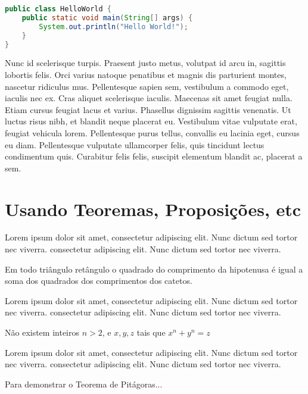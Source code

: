 \begin{lstlisting}[language=Java,caption={Hello World em Java}]
public class HelloWorld {
	public static void main(String[] args) {
		System.out.println("Hello World!");
	}
}
\end{lstlisting}

Nunc id scelerisque turpis. Praesent justo metus, volutpat id arcu in, sagittis lobortis felis. Orci varius natoque penatibus et magnis dis parturient montes, nascetur ridiculus mus. Pellentesque sapien sem, vestibulum a commodo eget, iaculis nec ex. Cras aliquet scelerisque iaculis. Maecenas sit amet feugiat nulla. Etiam cursus feugiat lacus et varius. Phasellus dignissim sagittis venenatis. Ut luctus risus nibh, et blandit neque placerat eu. Vestibulum vitae vulputate erat, feugiat vehicula lorem. Pellentesque purus tellus, convallis eu lacinia eget, cursus eu diam. Pellentesque vulputate ullamcorper felis, quis tincidunt lectus condimentum quis. Curabitur felis felis, suscipit elementum blandit ac, placerat a sem.

\section{Usando Teoremas, Proposições, etc}

Lorem ipsum dolor sit amet, consectetur adipiscing elit. Nunc dictum sed tortor nec viverra. consectetur adipiscing elit. Nunc dictum sed tortor nec viverra.

\begin{teo}[Pitágoras]
	Em todo triângulo retângulo o quadrado do comprimento da
	hipotenusa é igual a soma dos quadrados dos comprimentos dos catetos.
\end{teo}

Lorem ipsum dolor sit amet, consectetur adipiscing elit. Nunc dictum sed tortor nec viverra. consectetur adipiscing elit. Nunc dictum sed tortor nec viverra.

\begin{teo}[Fermat]
	Não existem inteiros $n > 2$, e $x, y, z$ tais que $x^n + y^n = z$
\end{teo}

Lorem ipsum dolor sit amet, consectetur adipiscing elit. Nunc dictum sed tortor nec viverra. consectetur adipiscing elit. Nunc dictum sed tortor nec viverra.

\begin{prop}
	Para demonstrar o Teorema de Pitágoras...
\end{prop}

